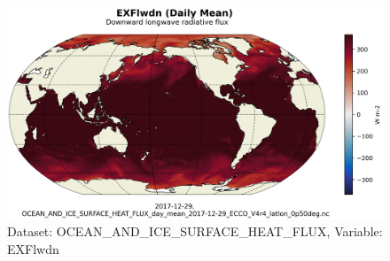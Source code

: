 \begin{figure}[H]
\centering
\includegraphics[scale=0.55]{../images/plots/latlon_plots/Ocean_and_Sea-Ice_Surface_Heat_Fluxes/EXFlwdn.png}
\caption{Dataset: OCEAN\_AND\_ICE\_SURFACE\_HEAT\_FLUX, Variable: EXFlwdn}
\label{tab:table-OCEAN_AND_ICE_SURFACE_HEAT_FLUX_EXFlwdn-Plot}
\end{figure}
\pagebreak
